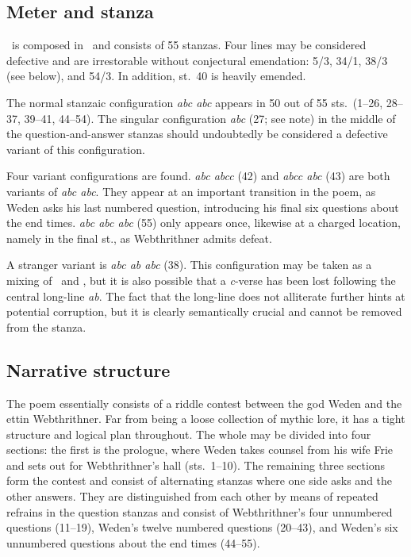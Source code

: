 \subsection{Meter and stanza}

\Vafthrudnismal\ is composed in \Ljodahattr\ and consists of 55 stanzas.  Four lines may be considered defective and are irrestorable without conjectural emendation: 5/3, 34/1, 38/3 (see below), and 54/3.  In addition, st.~40 is heavily emended.

The normal stanzaic configuration \emph{abc abc} appears in 50 out of 55 sts.~(1--26, 28--37, 39--41, 44--54).  The singular configuration \emph{abc} (27; see note) in the middle of the question-and-answer stanzas should undoubtedly be considered a defective variant of this configuration.

Four variant configurations are found.  \emph{abc abcc} (42) and \emph{abcc abc} (43) are both variants of \emph{abc abc}.  They appear at an important transition in the poem, as Weden asks his last numbered question, introducing his final six questions about the end times.
\emph{abc abc abc} (55) only appears once, likewise at a charged location, namely in the final st., as Webthrithner admits defeat.

A stranger variant is \emph{abc ab abc} (38).  This configuration may be taken as a mixing of \Ljodahattr\ and \Malahattr, but it is also possible that a \emph{c}-verse has been lost following the central long-line \emph{ab}.  The fact that the long-line does not alliterate further hints at potential corruption, but it is clearly semantically crucial and cannot be removed from the stanza.

\subsection{Narrative structure}

The poem essentially consists of a riddle contest between the god Weden and the ettin Webthrithner.  Far from being a loose collection of mythic lore, it has a tight structure and logical plan throughout.  The whole may be divided into four sections: the first is the prologue, where Weden takes counsel from his wife Frie and sets out for Webthrithner’s hall (sts.~1--10).  The remaining three sections form the contest and consist of alternating stanzas where one side asks and the other answers.  They are distinguished from each other by means of repeated refrains in the question stanzas and consist of Webthrithner’s four unnumbered questions (11--19), Weden’s twelve numbered questions (20--43), and Weden’s six unnumbered questions about the end times (44--55).

